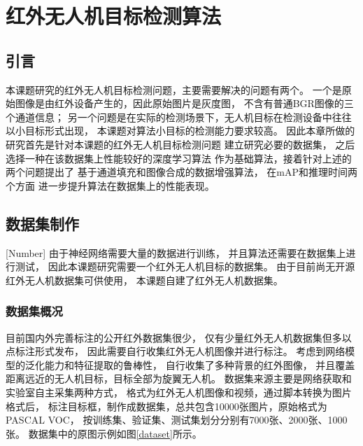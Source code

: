 
\chapter{红外无人机目标检测算法}

\section{引言}
本课题研究的红外无人机目标检测问题，主要需要解决的问题有两个。
一个是原始图像是由红外设备产生的，因此原始图片是灰度图，
不含有普通BGR图像的三个通道信息；
另一个问题是在实际的检测场景下，无人机目标在检测设备中往往以小目标形式出现，
本课题对算法小目标的检测能力要求较高。
因此本章所做的研究首先是针对本课题的红外无人机目标检测问题
建立研究必要的数据集，
之后选择一种在该数据集上性能较好的深度学习算法
作为基础算法，接着针对上述的两个问题提出了
基于通道填充和图像合成的数据增强算法，
在mAP和推理时间两个方面
进一步提升算法在数据集上的性能表现。

\section{数据集制作}[Number]
由于神经网络需要大量的数据进行训练，
并且算法还需要在数据集上进行测试，
因此本课题研究需要一个红外无人机目标的数据集。
由于目前尚无开源红外无人机数据集可供使用，
本课题自建了红外无人机数据集。

\subsection{数据集概况}
目前国内外完善标注的公开红外数据集很少，
仅有少量红外无人机数据集但多以点标注形式发布，
因此需要自行收集红外无人机图像并进行标注。
考虑到网络模型的泛化能力和特征提取的鲁棒性，
自行收集了多种背景的红外图像，
并且覆盖距离远近的无人机目标，目标全部为旋翼无人机。
数据集来源主要是网络获取和实验室自主采集两种方式，
格式为红外无人机图像和视频，通过脚本转换为图片格式后，
标注目标框，制作成数据集，总共包含10000张图片，原始格式为PASCAL VOC，
按训练集、验证集、测试集划分分别有7000张、2000张、1000张。
数据集中的原图示例如图\ref{dataset}所示。

